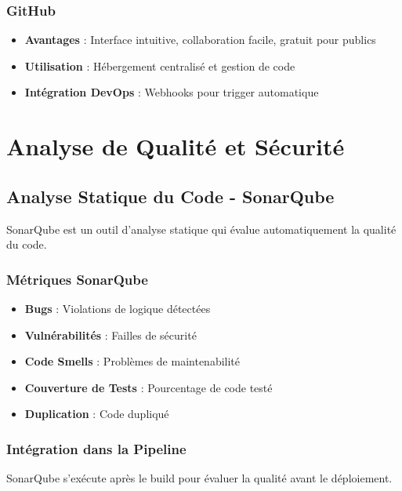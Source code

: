 \documentclass[12pt,a4paper]{report}
\begin{document}
\subsubsection{GitHub}

\begin{itemize}
    \item \textbf{Avantages} : Interface intuitive, collaboration facile, gratuit pour publics
    \item \textbf{Utilisation} : Hébergement centralisé et gestion de code
    \item \textbf{Intégration DevOps} : Webhooks pour trigger automatique
\end{itemize}

\section{Analyse de Qualité et Sécurité}

\subsection{Analyse Statique du Code - SonarQube}

SonarQube est un outil d'analyse statique qui évalue automatiquement la qualité du code.

\subsubsection{Métriques SonarQube}

\begin{itemize}
    \item \textbf{Bugs} : Violations de logique détectées
    \item \textbf{Vulnérabilités} : Failles de sécurité
    \item \textbf{Code Smells} : Problèmes de maintenabilité
    \item \textbf{Couverture de Tests} : Pourcentage de code testé
    \item \textbf{Duplication} : Code dupliqué
\end{itemize}

\subsubsection{Intégration dans la Pipeline}

SonarQube s'exécute après le build pour évaluer la qualité avant le déploiement.
\end{document}
